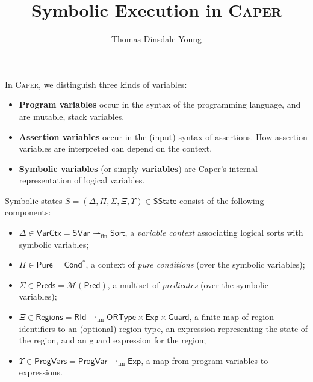 \documentclass[a4paper]{article}
\newcommand{\fpfun}{\rightharpoonup_{\mathrm{fin}}}
\newcommand{\mktype}[1]{\mathsf{#1}}
\newcommand{\tsvars}{\mktype{SVar}}
\newcommand{\tsort}{\mktype{Sort}}
\newcommand{\tcond}{\mktype{Cond}}
\newcommand{\tpred}{\mktype{Pred}}
\newcommand{\trid}{\mktype{RId}}
\newcommand{\torty}{\mktype{ORType}}
\newcommand{\texp}{\mktype{Exp}}
\newcommand{\tguard}{\mktype{Guard}}
\newcommand{\tpvar}{\mktype{ProgVar}}
\newcommand{\tsstate}{\mktype{SState}}
\newcommand{\tvctx}{\mktype{VarCtx}}
\newcommand{\tpcnds}{\mktype{Pure}}
\newcommand{\tpreds}{\mktype{Preds}}
\newcommand{\tregs}{\mktype{Regions}}
\newcommand{\tpvars}{\mktype{ProgVars}}
\newcommand{\sstate}{S}
\newcommand{\vctx}{\Delta}
\newcommand{\pcnds}{\Pi}
\newcommand{\preds}{\Sigma}
\newcommand{\regs}{\Xi}
\newcommand{\pvars}{\Upsilon}
\begin{document}
\title{Symbolic Execution in \textsc{Caper}}
\author{Thomas Dinsdale-Young}
\maketitle

In \textsc{Caper}, we distinguish three kinds of variables:
\begin{itemize}
  \item \textbf{Program variables} occur in the syntax of the programming language, and are mutable, stack variables.
  \item \textbf{Assertion variables} occur in the (input) syntax of assertions.
    How assertion variables are interpreted can depend on the context.
  \item \textbf{Symbolic variables} (or simply \textbf{variables}) are Caper's internal representation of logical variables.
\end{itemize}

Symbolic states $\sstate = (\vctx,\pcnds,\preds,\regs,\pvars) \in \tsstate$ consist of the following components:
\begin{itemize}
  \item $\vctx \in \tvctx = \tsvars \fpfun \tsort$, a \emph{variable context} associating logical sorts with symbolic variables;
  \item $\pcnds \in \tpcnds = \tcond^*$, a context of \emph{pure conditions} (over the symbolic variables);
  \item $\preds \in \tpreds = \mathcal{M}(\tpred)$, a multiset of \emph{predicates} (over the symbolic variables);
  \item $\regs \in \tregs = \trid \fpfun \torty \times \texp \times \tguard$, a finite map of region identifiers to an (optional) region type, an expression representing the state of the region, and an guard expression for the region;
  \item $\pvars \in \tpvars = \tpvar \fpfun \texp$, a map from program variables to expressions.
\end{itemize}
\end{document}
